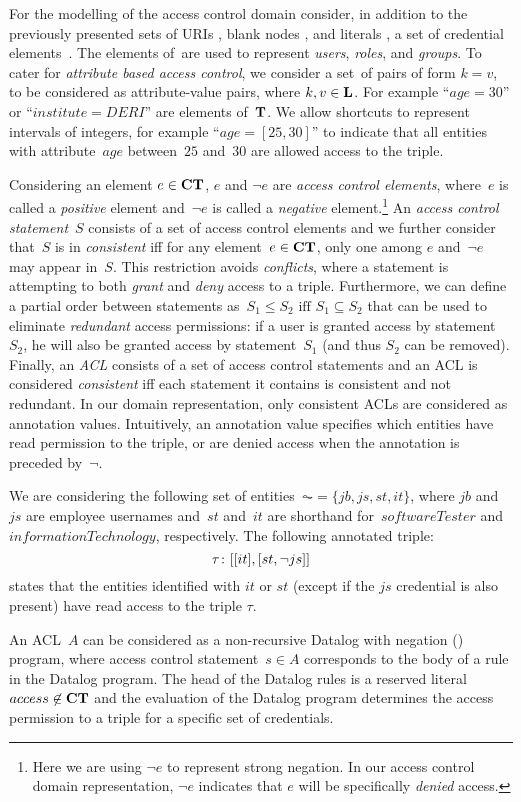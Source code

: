
For the modelling of the access control domain consider, in addition to the previously presented sets of URIs \AU, blank
nodes \AB, and literals \AL, a set of credential elements~\AC.
%
The elements of~\AC are used to represent \emph{users}, \emph{roles}, and \emph{groups}.
%
To cater for \emph{attribute based access control}, we consider a set~\AT of pairs of form $k=v$, to be considered as
attribute-value pairs, where $k,v \in \mathbf{L}$.  For example ``$age=30$'' or ``$institute=DERI$'' are elements
of~$\mathbf{T}$.  We allow shortcuts to represent intervals of integers, for example ``$age=[25,30]$'' to indicate that
all entities with attribute~$age$ between~$25$ and~$30$ are allowed access to the triple.

Considering an element $e \in \mathbf{CT}$, $e$ and $\neg e$ are \emph{access control elements}, where~$e$ is called a
\emph{positive} element and~$\neg e$ is called a \emph{negative} element.\footnote{Here we are using $\neg e$ to
  represent strong negation.  In our access control domain representation, $\neg e$ indicates that $e$ will be
  specifically \emph{denied} access.}
%
An \emph{access control statement}~$S$ consists of a set of access control elements and we further consider that~$S$ is
in \emph{consistent} iff for any element~$e \in \mathbf{CT}$, only one among $e$ and~$\neg e$ may appear in~$S$.  This
restriction avoids \emph{conflicts}, where a statement is attempting to both \emph{grant} and \emph{deny} access to a
triple.
%
Furthermore, we can define a partial order between statements as~$S_{1} \leq S_{2} \mbox{ iff\ } S_{1} \subseteq S_{2}$
that can be used to eliminate \emph{redundant} access permissions: if a user is granted access by statement~$S_{2}$, he
will also be granted access by statement~$S_{1}$ (and thus $S_{2}$ can be removed). 
%
Finally, an \emph{\ac{ACL}} consists of a set of access control statements and an \ac{ACL} is considered
\emph{consistent} iff each statement it contains is consistent and not redundant.  In our domain representation, only
consistent \acp{ACL} are considered as annotation values.
%
Intuitively, an annotation value specifies which entities have read permission to the triple, or are denied access when
the annotation is preceded by~$\neg$.
%
\begin{example}
  \label{ex:ann-value}
  We are considering the following set of entities~$\AC = \{ jb,js,st,it \}$, where $jb$ and $js$ are employee usernames
  and~$st$ and~$it$ are shorthand for~$\mathit{softwareTester}$ and~$\mathit{informationTechnology}$, respectively.
  The following annotated triple:
  $$\mbox{$\tau\colon[[it],[st, \neg js]]$}$$
  states that the entities identified with $it$ or $st$ (except if the $js$ credential is also present) have read access
  to the triple $\tau$.
\end{example}
%
An \ac{ACL}~$A$ can be considered as a non-recursive Datalog with negation (\nrdn) program, where access control
statement~$s \in A$ corresponds to the body of a rule in the Datalog program.
%
The head of the Datalog rules is a reserved literal $access \not\in\mathbf{CT}$ and the evaluation of the Datalog program
determines the access permission to a triple for a specific set of credentials.

